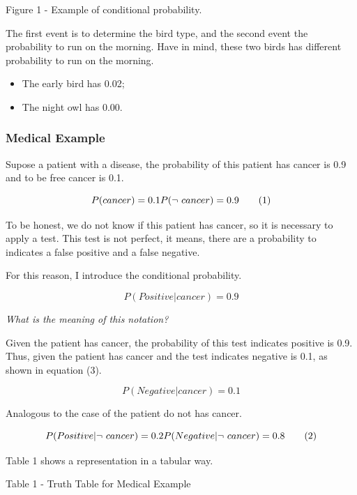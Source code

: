 \documentclass[]{book}
\providecommand{\tightlist}{%
  \setlength{\itemsep}{0pt}\setlength{\parskip}{0pt}}
\begin{document}
Figure 1 - Example of conditional probability.

The first event is to determine the bird type, and the second event the
probability to run on the morning. Have in mind, these two birds has
different probability to run on the morning.

\begin{itemize}
\tightlist
\item
  The early bird has 0.02;
\item
  The night owl has 0.00.
\end{itemize}

\subsubsection{Medical Example}\label{medical-example}

Supose a patient with a disease, the probability of this patient has
cancer is 0.9 and to be free cancer is 0.1.

\[P(cancer) = 0.1 \\
  P(\neg \ cancer) = 0.9 \tag{1}\]

To be honest, we do not know if this patient has cancer, so it is
necessary to apply a test. This test is not perfect, it means, there are
a probability to indicates a false positive and a false negative.

For this reason, I introduce the conditional probability.

\[ P(Positive | cancer) = 0.9 \tag{2}\]

\emph{What is the meaning of this notation?}

Given the patient has cancer, the probability of this test indicates
positive is 0.9. Thus, given the patient has cancer and the test
indicates negative is 0.1, as shown in equation (3).

\[ P(Negative | cancer) = 0.1 \tag{3}\]

Analogous to the case of the patient do not has cancer.

\[ P(Positive | \neg \ cancer) = 0.2 \\
   P(Negative | \neg \ cancer) = 0.8 \tag{2} \]

Table 1 shows a representation in a tabular way.

Table 1 - Truth Table for Medical Example
\end{document}
